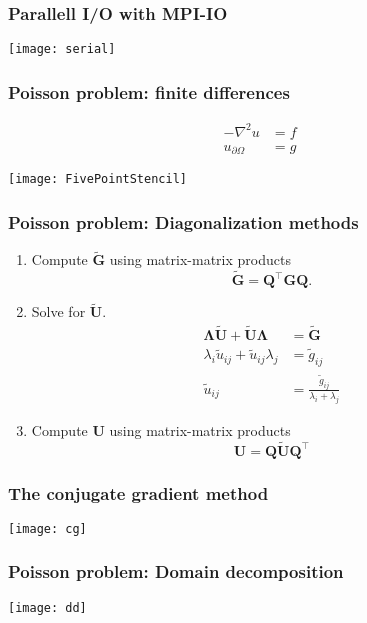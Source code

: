 \begin{frame}
  \frametitle{Parallell I/O with MPI-IO}
  \begin{center}
    \texttt{[image: serial]}
  \end{center}
\end{frame}

\begin{frame}
  \frametitle{Poisson problem: finite differences}
  \[
    \begin{split}
      -\nabla^2 u &= f \\
      u_{\partial\Omega} &= g
    \end{split}
  \]
  \begin{center}
    \texttt{[image: FivePointStencil]}
  \end{center}
\end{frame}

\begin{frame}
  \frametitle{Poisson problem: Diagonalization methods}
  \begin{enumerate}
  \item Compute $\tilde{\bm G}$ using matrix-matrix products
    \begin{equation*}
      \tilde{\bm G} = \bm Q^\intercal \bm G \bm Q.
    \end{equation*}
  \item Solve for $\tilde{\bm U}$.
    \begin{align*}
      \bm \Lambda \tilde{\bm U} + \tilde{\bm U} \bm \Lambda &= \tilde{\bm G} \\
      \lambda_i \tilde{u}_{ij} + \tilde{u}_{ij} \lambda_j &= \tilde{g}_{ij} \\
      \tilde{u}_{ij} &= \frac{\tilde{g}_{ij}}{\lambda_i + \lambda_j}
    \end{align*}
  \item Compute $\bm U$ using matrix-matrix products
    \begin{equation*}
      \bm U = \bm Q \tilde{\bm U} \bm Q^\intercal
    \end{equation*}
  \end{enumerate}
\end{frame}

\begin{frame}
  \frametitle{The conjugate gradient method}
  \begin{center}
    \texttt{[image: cg]}
  \end{center}
\end{frame}

\begin{frame}
  \frametitle{Poisson problem: Domain decomposition}
  \begin{center}
    \texttt{[image: dd]}
  \end{center}
\end{frame}


